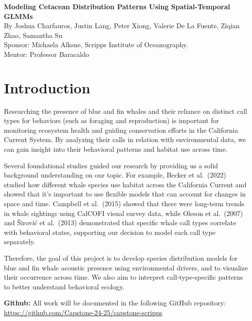 \documentclass[
]{article}
\author{}
\date{\vspace{-2.5em}}
\begin{document}
\vspace*{\fill}

\begin{center}
\Huge \textbf{Modeling Cetacean Distribution Patterns Using Spatial-Temporal GLMMs} \\[0.5cm]
\large By Joshua Charfauros, Justin Lang, Peter Xiong, Valerie De La Fuente, Ziqian Zhao, Samantha Su \\[0.2cm]
\normalsize Sponsor: Michaela Alksne, Scripps Institute of Oceanography.\\
\normalsize Mentor: Professor Baracaldo

\end{center}
\vspace*{\fill}
\thispagestyle{empty}
\newpage

\section{Introduction}\label{introduction}

Researching the presence of blue and fin whales and their reliance on
distinct call types for behaviors (such as foraging and reproduction) is
important for monitoring ecosystem health and guiding conservation
efforts in the California Current System. By analyzing their calls in
relation with environmental data, we can gain insight into their
behavioral patterns and habitat use across time.

Several foundational studies guided our research by providing us a solid
background understanding on our topic. For example, Becker et al.~(2022)
studied how different whale species use habitat across the California
Current and showed that it's important to use flexible models that can
account for changes in space and time. Campbell et al.~(2015) showed
that there were long-term trends in whale sightings using CalCOFI visual
survey data, while Oleson et al.~(2007) and Širović et al.~(2013)
demonstrated that specific whale call types correlate with behavioral
states, supporting our decision to model each call type separately.

Therefore, the goal of this project is to develop species distribution
models for blue and fin whale acoustic presence using environmental
drivers, and to visualize their occurrence across time. We also aim to
interpret call-type-specific patterns to better understand behavioral
ecology.

\textbf{Github:} All work will be documented in the following GitHub
repository:\\
\url{https://github.com/Capstone-24-25/capstone-scripps}
\end{document}
